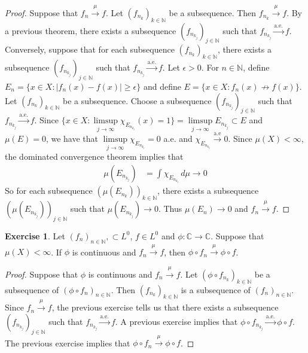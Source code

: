 \documentclass[12pt]{amsart}
\theoremstyle{definition}
\newtheorem{ex}[definition]{Exercise}
\newcommand{\ep}{\epsilon}
\newcommand{\C}{\mathbb{C}}
\newcommand{\N}{\mathbb{N}}
\newcommand{\dmu}{\, d \mu}
\newcommand{\convt}[1]{\xrightarrow{\text{#1}}}
\newcommand{\conv}[1]{\xrightarrow{#1}}
\newcommand{\lex}[1]{\label{ex:#1}}
\begin{document}
	\begin{proof}
		Suppose that $f_n \conv{\mu} f$. Let $(f_{n_k})_{k \in \N}$ be a subsequence. Then $f_{n_k} \conv{\mu} f$. By a previous theorem, there exists a subsequence $(f_{n_{k_j}})_{j \in \N}$ such that $f_{n_{k_j}} \convt{a.e.} f$. Conversely, suppose that for each subsequence $(f_{n_k})_{k \in \N}$, there exists a subsequence $(f_{n_{k_j}})_{j \in \N}$ such that $f_{n_{k_j}} \convt{a.e.} f$. Let $\ep >0$. For $n \in \N$, define $E_{n} = \{x \in X: |f_n(x) - f(x) | \geq \ep\}$ and define $E = \{x \in X: f_n(x) \not \rightarrow f(x)\}$. Let $(f_{n_k})_{k \in \N}$ be a subsequence. Choose a subsequence $(f_{n_{k_j}})_{j \in \N}$ such that $f_{n_{k_j}} \convt{a.e.} f$. Since $\bigg \{x \in X: \limsup\limits_{j \rightarrow \infty} \chi_{E_{n_{k_j}}}(x) = 1\bigg \} = \limsup\limits_{j \rightarrow \infty} E_{n_{k_j}} \subset E$ and $\mu(E) = 0$, we have that $\limsup\limits_{j \rightarrow \infty} \chi_{E_{n_{k_j}}} = 0$ a.e. and $\chi_{E_{n_{k_j}}} \convt{a.e} 0$. Since $\mu(X) < \infty$, the dominated convergence theorem implies that 
		\begin{align*}
			\mu(E_{n_{k_j}}) 
			&= \int \chi_{E_{n_{k_j}}} \dmu  \rightarrow 0
		\end{align*} 
		So for each subsequence $(\mu(E_{n_k}))_{k \in \N}$, there exists a subsequence $(\mu(E_{n_{k_j}}))_{j \in \N}$ such that $\mu(E_{n_{k_j}}) \rightarrow 0$. Thus $\mu(E_n) \rightarrow 0$ and $f_n \conv{\mu} f$.
	\end{proof}
	
	\begin{ex} \lex{35014} 
		Let $(f_n)_{n \in \N}, \subset L^0$, $f \in L^0$ and $\phi: \C \rightarrow \C$. Suppose that $\mu(X) < \infty$. If $\phi$ is continuous and $f_n \conv{\mu} f$, then $\phi \circ f_n \conv{\mu} \phi \circ f$.
	\end{ex}
	
	\begin{proof}
		Suppose that $\phi$ is continuous and $f_n \conv{\mu} f$. Let $(\phi \circ f_{n_k})_{k \in \N}$ be a subsequence of $(\phi \circ f_{n})_{n \in \N}$. Then $(f_{n_k})_{k \in \N}$ is a subsequence of $(f_{n})_{n \in \N}$. Since $f_n \conv{\mu} f$, the previous exercise tells us that there exists a subsequence $(f_{n_{k_j}})_{j \in \N}$ such that $f_{n_{k_j}} \convt{a.e.} f$. A previous exercise implies that $\phi \circ f_{n_{k_j}}\convt{a.e.} \phi \circ f$. The previous exercise implies that $\phi \circ f_{n}\conv{\mu} \phi \circ f$.
	\end{proof}
	
\end{document}
